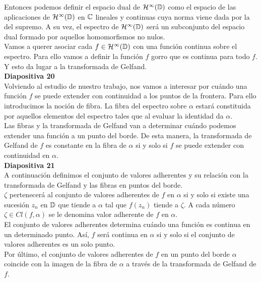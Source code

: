 \documentclass[spanish, a4paper, 12pt]{article}
\begin{document}
Entonces podemos definir el espacio dual de $\mathcal{H}^{\infty}(\mathbb{D})$ como el espacio de las aplicaciones de $\mathcal{H}^{\infty}(\mathbb{D})$ en $\mathbb{C}$ lineales y continuas cuya norma viene dada por la del supremo. A su vez, el espectro de $\mathcal{H}^{\infty}(\mathbb{D})$ será un subconjunto del espacio dual formado por aquellos homomorfismos no nulos. \\

Vamos a querer asociar cada $f \in \mathcal{H}^{\infty}(\mathbb{D})$ con una función continua sobre el espectro. Para ello vamos a definir la función $f$ gorro que es continua para todo $f$. Y esto da lugar a la transformada de Gelfand. \\

\textbf{Diapositiva 20} \\

Volviendo al estudio de nuestro trabajo, nos vamos a interesar por cuándo una función $f$ se puede extender con continuidad a los puntos de la frontera. Para ello introducimos la noción de fibra. La fibra del espectro sobre $\alpha$ estará constituida por aquellos elementos del espectro tales que al evaluar la identidad da $\alpha$. \\

Las fibras y la transformada de Gelfand van a determinar cuándo podemos extender una función a un punto del borde. De esta manera, la transformada de Gelfand de $f$ es constante en la fibra de $\alpha$ si y solo si $f$ se puede extender con continuidad en $\alpha$. \\

\textbf{Diapositiva 21} \\

A continuación definimos el conjunto de valores adherentes y su relación con la transformada de Gelfand y las fibras en puntos del borde. \\

$\zeta$ pertenecerá al conjunto de valores adherentes de $f$ en $\alpha$ si y solo si existe una sucesión $z_n$ en $\mathbb{D}$ que tiende a $\alpha$ tal que $f(z_n)$ tiende a $\zeta$. A cada número $\zeta \in Cl(f, \alpha)$ se le denomina valor adherente de $f$ en $\alpha$. \\

El conjunto de valores adherentes determina cuándo una función es continua en un determinado punto. Así, $f$ será continua en $\alpha$ si y solo si el conjunto de valores adherentes es un solo punto. \\

Por último, el conjunto de valores adherentes de $f$ en un punto
del borde $\alpha$ coincide con la imagen de la fibra de $\alpha$ a través de la transformada de Gelfand de $f$. \\
\end{document}
